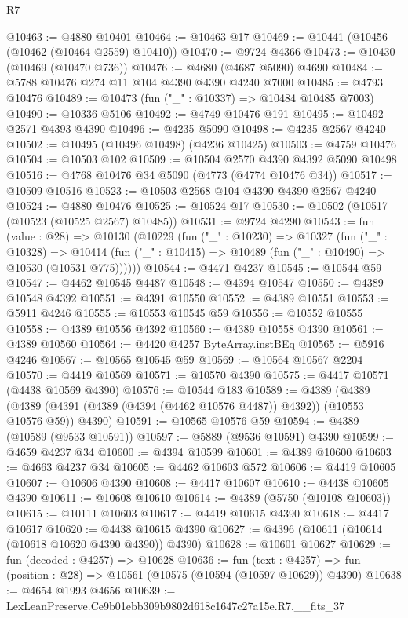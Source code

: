 \begin{lexlean}{R7}
\begin{coremodule}
@10463 := @4880 @10401
@10464 := @10463 @17
@10469 := @10441 (@10456 (@10462 (@10464 @2559) @10410))
@10470 := @9724 @4366
@10473 := @10430 (@10469 (@10470 @736))
@10476 := @4680 (@4687 @5090) @4690
@10484 := @5788 @10476 @274 @11 @104 @4390 @4390 @4240 @7000
@10485 := @4793 @10476
@10489 := @10473 (fun ("_" : @10337) => @10484 @10485 @7003)
@10490 := @10336 @5106
@10492 := @4749 @10476 @191
@10495 := @10492 @2571 @4393 @4390
@10496 := @4235 @5090
@10498 := @4235 @2567 @4240
@10502 := @10495 (@10496 @10498) (@4236 @10425)
@10503 := @4759 @10476
@10504 := @10503 @102
@10509 := @10504 @2570 @4390 @4392 @5090 @10498
@10516 := @4768 @10476 @34 @5090 (@4773 (@4774 @10476 @34))
@10517 := @10509 @10516
@10523 := @10503 @2568 @104 @4390 @4390 @2567 @4240
@10524 := @4880 @10476
@10525 := @10524 @17
@10530 := @10502 (@10517 (@10523 (@10525 @2567) @10485))
@10531 := @9724 @4290
@10543 := fun (value : @28) =>
  @10130
    (@10229
      (fun ("_" : @10230) =>
      @10327
        (fun ("_" : @10328) =>
        @10414 (fun ("_" : @10415) => @10489 (fun ("_" : @10490) => @10530 (@10531 @775))))))
@10544 := @4471 @4237
@10545 := @10544 @59
@10547 := @4462 @10545 @4487
@10548 := @4394 @10547
@10550 := @4389 @10548 @4392
@10551 := @4391 @10550
@10552 := @4389 @10551
@10553 := @5911 @4246
@10555 := @10553 @10545 @59
@10556 := @10552 @10555
@10558 := @4389 @10556 @4392
@10560 := @4389 @10558 @4390
@10561 := @4389 @10560
@10564 := @4420 @4257 ByteArray.instBEq
@10565 := @5916 @4246
@10567 := @10565 @10545 @59
@10569 := @10564 @10567 @2204
@10570 := @4419 @10569
@10571 := @10570 @4390
@10575 := @4417 @10571 (@4438 @10569 @4390)
@10576 := @10544 @183
@10589 := @4389
    (@4389 (@4389 (@4391 (@4389 (@4394 (@4462 @10576 @4487)) @4392)) (@10553 @10576 @59)) @4390)
@10591 := @10565 @10576 @59
@10594 := @4389 (@10589 (@9533 @10591))
@10597 := @5889 (@9536 @10591) @4390
@10599 := @4659 @4237 @34
@10600 := @4394 @10599
@10601 := @4389 @10600
@10603 := @4663 @4237 @34
@10605 := @4462 @10603 @572
@10606 := @4419 @10605
@10607 := @10606 @4390
@10608 := @4417 @10607
@10610 := @4438 @10605 @4390
@10611 := @10608 @10610
@10614 := @4389 (@5750 (@10108 @10603))
@10615 := @10111 @10603
@10617 := @4419 @10615 @4390
@10618 := @4417 @10617
@10620 := @4438 @10615 @4390
@10627 := @4396 (@10611 (@10614 (@10618 @10620 @4390 @4390)) @4390)
@10628 := @10601 @10627
@10629 := fun (decoded : @4257) => @10628
@10636 := fun (text : @4257) =>
  fun (position : @28) => @10561 (@10575 (@10594 (@10597 @10629)) @4390)
@10638 := @4654 @1993 @4656
@10639 := LexLeanPreserve.Ce9b01ebb309b9802d618c1647c27a15e.R7.__fits_37

\end{coremodule}
\end{lexlean}
